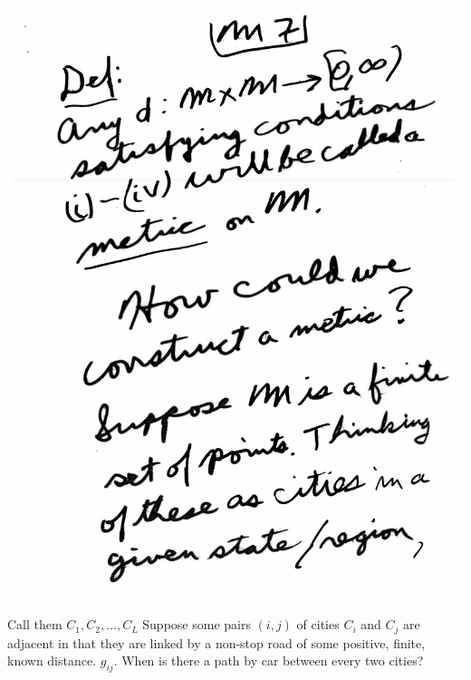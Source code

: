 \documentclass[10pt,a4paper]{article}
\begin{document}
\includegraphics[scale=.5]{Pages/MS_7}

\newpage

Call them $ C_1 , C_2 , \ldots , C_L $ Suppose some pairs $(i,j)$ of cities $C_i$ and $C_j$ are adjacent in that they are linked by a non-stop road of some positive, finite, known distance. $g_{ij}$. When is there a path by car between every two cities? 
 
\end{document}
